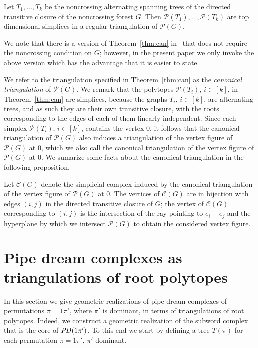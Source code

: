 \documentclass[ALCO,ThmDefs]{cedram}
\numberwithin{equation}{section}
\newcommand*\C{{\mathcal{C}}}
\renewcommand*\P{{\mathcal{P}}}
\newcommand*\+{\smash{\lower2pt\hbox{\rlap{\vrule height14pt}}\raise2pt\hbox{\rlap{\hskip-3pt \vrule height.4pt depth0pt width14.7pt}}}}
\newcommand*{\MK}{\mkern 2mu}
\DeclareMathOperator{\PD}{\textit{PD}\MK}
\begin{document}
\begin{theo}\label{thm:can}
Let $T_1, \dots, T_k$ be the noncrossing alternating spanning trees of the directed transitive closure of the noncrossing forest $G$. Then $\P(T_1), \dots, \P(T_k)$ are top dimensional simplices in a regular triangulation of $\P(G)$.
\end{theo}

We note that there is a version of Theorem~\ref{thm:can} in~\cite{root1} that does not require the noncrossing condition on $G$; however, in the present paper we only invoke the above version which has the advantage that it is easier to state. 

We refer to the triangulation specified in Theorem~\ref{thm:can} as the \emph{canonical triangulation} of $\P(G)$. We remark that the polytopes $\P(T_i)$, $i \in [k]$, in Theorem~\ref{thm:can} are simplices, because the graphs $T_i$, $i\in [k]$, are alternating trees, and as such they are their own transitive closure, with the roots corresponding to the edges of each of them linearly independent. Since each simplex $\P(T_i)$, $i \in [k]$, contains the vertex $0$, it follows that the canonical triangulation of $\P(G)$ also induces a triangulation of the vertex figure of $\P(G)$ at $0$, which we also call the canonical triangulation of the vertex figure of $\P(G)$ at $0$. We sumarize some facts about the canonical triangulation in the following proposition.

\begin{prop}\label{prop:cantriang}
Let $\C(G)$ denote the simplicial complex induced by the canonical triangulation of the vertex figure of $\P(G)$ at $0$. The vertices of $\C(G)$ are in bijection with edges $(i,j)$ in the directed transitive closure of $G$; the vertex of $\C(G)$ corresponding to $(i,j)$ is the intersection of the ray pointing to $e_i-e_j$ and the hyperplane by which we intersect $\P(G)$ to obtain the considered vertex figure.
\end{prop}


\section{Pipe dream complexes as triangulations of root polytopes}\label{sec:constr}

In this section we give geometric realizations of pipe dream complexes of permutations $\pi=1\pi'$, where $\pi'$ is dominant, in terms of triangulations of root polytopes. Indeed, we construct a geometric realization of the subword complex that is the core of $\PD(1\pi')$. To this end we start by defining a tree $T(\pi)$ for each permutation $\pi=1\pi'$, $\pi'$ dominant.
\end{document}
